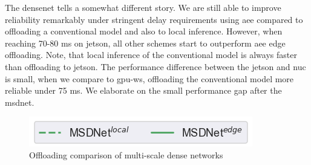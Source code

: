 The \gls{densenet} tells a somewhat different story. We are still able to improve reliability remarkably under stringent delay requirements using \gls{aee} compared to offloading a conventional model and also to local inference. However, when reaching 70-80 ms on \gls{jetson}, all other schemes start to outperform  \gls{aee} edge offloading. Note, that local inference of the conventional model is always faster than offloading to \gls{jetson}. The performance difference between the \gls{jetson} and \gls{nuc} is small, when we compare to \gls{gpu-ws}, offloading the conventional model more reliable under 75 ms. We elaborate on the small performance gap after the \gls{msdnet}.
\begin{figure}
	\captionsetup[subfigure]{justification=centering, farskip=0pt,captionskip=0pt}
	\centering
	\includegraphics[width=.3\linewidth]{figures/edge/gpu_msdnet_offloading_vs_local_legend}
	\hfill
	\hfill
	\caption[Offloading comparison of multi-scale dense networks]{Offloading comparison of multi-scale dense networks}
	\label{fig:msdnet-offloading-vs-local}
\end{figure}

